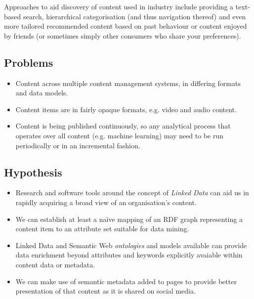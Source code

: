 \documentclass{sig-alternate-05-2015}
\begin{document}
Approaches to aid discovery of content used in industry include providing a
text-based search, hierarchical
categorisation (and thus navigation thereof) and even more tailored recommended
content based on past behaviour or content enjoyed by friends (or sometimes
simply other consumers who share your preferences).

\subsection{Problems}

\begin{itemize}

\item Content across multiple content management
systems, in differing formats and data models.

\item Content items are in fairly opaque formats, e.g. video and audio content.

\item Content is being published continuously, so any analytical process that operates
over all content (e.g. machine learning) may need to be run periodically or in
an incremental fashion.

\end{itemize}

\subsection{Hypothesis}

\begin{itemize}

\item Research and software tools around the concept of \emph{Linked Data} can
aid us in rapidly acquiring a broad view of an
organisation's content.

\item We can establish at least a na\"ive mapping of an RDF graph representing a
content item to an attribute set suitable for data mining.

\item Linked Data and Semantic Web \emph{ontologies} and models available can
provide data enrichment beyond attributes and keywords explicitly avaiable
within content data or metadata.

\item We can make use of semantic metadata added to pages
to provide better presentation of that content as it is shared on social media.

\end{itemize}
\end{document}
